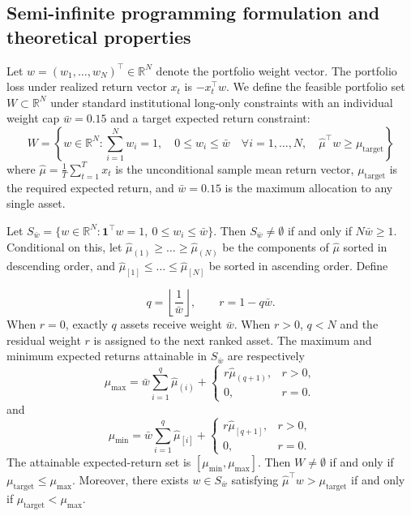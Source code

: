 \documentclass[smallextended]{svjour3}
\begin{document}
\subsection{Semi-infinite programming formulation and theoretical properties}
Let $w = (w_1, \dots, w_N)^\top \in \mathbb{R}^N$ denote the portfolio weight vector. The portfolio loss under realized return vector $x_t$ is $-x_t^\top w$. We define the feasible portfolio set $W \subset \mathbb{R}^N$ under standard institutional long-only constraints with an individual weight cap $\bar{w} = 0.15$ and a target expected return constraint:
\begin{equation}
    W = \left\{ w \in \mathbb{R}^N : \sum_{i=1}^N w_i = 1, \quad 0 \le w_i \le \bar{w} \quad \forall i=1,\dots,N, \quad \hat{\mu}^\top w \ge \mu_{\text{target}} \right\}
\end{equation}
where $\hat{\mu} = \frac{1}{T} \sum_{t=1}^T x_t$ is the unconditional sample mean return vector, $\mu_{\text{target}}$ is the required expected return, and $\bar{w} = 0.15$ is the maximum allocation to any single asset.

\begin{proposition}
Let $S_{\bar w}=\{w \in \mathbb{R}^N : \mathbf{1}^\top w=1,\ 0\leq w_i\leq\bar w\}$. Then $S_{\bar w}\neq\emptyset$ if and only if $N\bar w\geq 1$. Conditional on this, let $\hat{\mu}_{(1)} \ge \dots \ge \hat{\mu}_{(N)}$ be the components of $\hat{\mu}$ sorted in descending order, and $\hat{\mu}_{[1]} \le \dots \le \hat{\mu}_{[N]}$ be sorted in ascending order. Define

\[
q=\left\lfloor\frac{1}{\bar w}\right\rfloor,
\qquad
r=1-q\bar w.
\]
When $r=0$, exactly $q$ assets receive weight $\bar w$. When $r>0$,
$q<N$ and the residual weight $r$ is assigned to the next ranked asset. The maximum and minimum expected returns attainable in $S_{\bar w}$ are respectively \[
\mu_{\max} = \bar w\sum_{i=1}^{q}\hat\mu_{(i)} +
\begin{cases}
r\hat\mu_{(q+1)}, & r>0,\\
0, & r=0.
\end{cases}
\]
and
\[
\mu_{\min} = \bar{w} \sum_{i=1}^q \hat{\mu}_{[i]} +
\begin{cases}
r\hat\mu_{[q+1]}, & r>0,\\
0, & r=0.
\end{cases}
\]
The attainable expected-return set is $[\mu_{\min}, \mu_{\max}]$. Then $W\neq\emptyset$ if and only if $\mu_{\mathrm{target}}\leq\mu_{\max}$. Moreover, there exists $w\in S_{\bar w}$ satisfying $\hat\mu^\top w>\mu_{\mathrm{target}}$ if and only if $\mu_{\mathrm{target}}<\mu_{\max}$.
\end{proposition}
\end{document}
